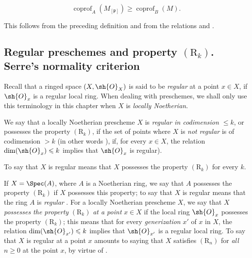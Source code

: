 \begin{equation}
\label{IV.5.7.13.1}
\operatorname{coprof}_A(M_{[\mathfrak{p}]})\geqslant\operatorname{coprof}_B(M). \tag{5.7.13.1}
\end{equation}

This follows from the preceding definition and from the relations  and .

\subsection{Regular preschemes and property \texorpdfstring{$(\mathrm{R}_k)$}{(Rk)}. Serre's normality criterion}
\label{subsection:IV.5.8}

\begin{env}[5.8.1]
\label{IV.5.8.1}
Recall  that a ringed space $(X,\sh{O}_X)$ is said to be \emph{regular} at a point $x\in X$, if $\sh{O}_x$ is a regular local ring.
When dealing with preschemes, we shall only use this terminology in this chapter when $X$ is \emph{locally Noetherian}.
\end{env}

\begin{definition}[5.8.2]
\label{IV.5.8.2}
We say that a locally Noetherian prescheme $X$ is \emph{regular in codimension $\leqslant k$}, or possesses the property $(\mathrm{R}_k)$, if the set of points where $X$ is \emph{not regular} is of codimension $>k$ (in other words ), if, for every $x\in X$, the relation $\dim(\sh{O}_x)\leqslant k$ implies that $\sh{O}_x$ is regular).
\end{definition}

To say that $X$ is regular means that $X$ possesses the property $(\mathrm{R}_k)$ for every $k$.

If $X=\Spec(A)$, where $A$ is a Noetherian ring, we say that $A$ possesses the property $(\mathrm{R}_k)$ if $X$ possesses this property; to say that $X$ is regular means that the ring $A$ is \emph{regular} .
For a locally Noetherian prescheme $X$, we say that $X$ \emph{possesses the property} $(\mathrm{R}_k)$ \emph{at a point} $x\in X$ if the local ring $\sh{O}_x$ possesses the property $(\mathrm{R}_k)$; this means that for every \emph{generization} $x'$ of $x$ in $X$, the relation $\dim(\sh{O}_{x'})\leqslant k$ implies that $\sh{O}_{x'}$ is a regular local ring.
To say that $X$ is regular at a point $x$ amounts to saying that $X$ satisfies $(\mathrm{R}_n)$ for \emph{all} $n\geqslant 0$ at the point $x$, by virtue of .

